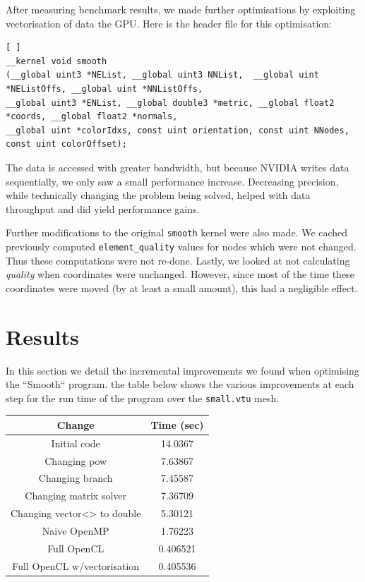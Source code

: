 \documentclass[a4paper,12pt, twocolumn]{article}
\begin{document}
After measuring benchmark results, we made further optimisations by exploiting vectorisation of data the GPU.  Here is the header file for this optimisation:
\begin{lstlisting}[ ]
__kernel void smooth
(__global uint3 *NEList, __global uint3 NNList,  __global uint *NEListOffs, __global uint *NNListOffs,
__global uint3 *ENList, __global double3 *metric, __global float2 *coords, __global float2 *normals,
__global uint *colorIdxs, const uint orientation, const uint NNodes, const uint colorOffset);
\end{lstlisting}
The data is accessed with greater bandwidth, but because NVIDIA writes data sequentially, we only saw a small performance increase.  Decreasing precision, while technically changing the problem being solved, helped with data throughput and did yield performance gains.

Further modifications to the original \verb+smooth+ kernel were also made.  We cached previously computed \verb+element_quality+ values for nodes which were not changed.  Thus these computations were not re-done.  Lastly, we looked at not calculating \emph{quality} when coordinates were unchanged.  However, since most of the time these coordinates were moved (by at least a small amount), this had a negligible effect.

\section{Results}
In this section we detail the incremental improvements we found when optimising the ``Smooth`` program.   the table below shows the various improvements at each step for the run time of the program over the \verb+small.vtu+ mesh.
\begin{tabular}{|c|c|}
\hline
Change & Time (sec)  \\ \hline
Initial code & 14.0367 \\  \hline
Changing pow & 7.63867  \\ \hline
Changing branch & 7.45587 \\ \hline
Changing matrix solver & 7.36709 \\ \hline
Changing vector<> to double &  5.30121 \\ \hline
Naive OpenMP & 1.76223 \\ \hline
Full OpenCL & 0.406521 \\ \hline
Full OpenCL w/vectorisation & 0.405536 \\ \hline
\end{tabular}
\end{document}
